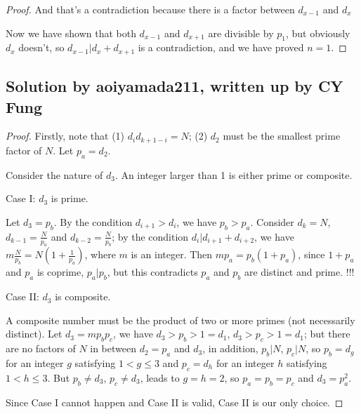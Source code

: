 \begin{proof}
And that's a contradiction because there is a factor between $ d_{x-1} $ and $ d_x $

Now we have shown that both $ d_{x - 1} $ and $ d_{x + 1} $ are divisible by $ p_1 $, but obviously $ d_x $ doesn't, so $ d_{x-1} | d_x + d_{x+1} $ is a contradiction, and we have proved $ n = 1 $.

\end{proof}

\subsection*{Solution by aoiyamada211, written up by CY Fung}

\begin{proof}

Firstly, note that (1) $d_i d_{k+1-i} = N$; (2) $d_2$ must be the smallest prime factor of $N$. Let $p_a = d_2$.

\hspace{3em}

Consider the nature of $d_3$. An integer larger than 1 is either prime or composite.

\hspace{3em}

Case I: $d_3$ is prime.

Let $d_3 = p_b$. By the condition $d_{i+1} > d_i$, we have $p_b > p_a$. Consider $d_k = N$, $d_{k-1} = \frac{N}{p_a}$ and $d_{k-2} = \frac{N}{p_b}$; by the condition $d_i | d_{i+1} + d_{i+2}$, we have $ m \frac{N}{p_b} = N(1+\frac{1}{p_a}) $, where $m$ is an integer. Then $ m p_a = p_b (1 + p_a)$, since $1+p_a$ and $p_a$ is coprime, $p_a | p_b$, but this contradicts $p_a$ and $p_b$ are distinct and prime. !!!

\hspace{3em}

Case II: $d_3$ is composite.

A composite number must be the product of two or more primes (not necessarily distinct). Let $d_3 = m p_b p_c $, we have $d_3 > p_b > 1 = d_1 $, $d_3 > p_c > 1 = d_1$; but there are no factors of $N$ in between $d_2 = p_a$ and $d_3$, in addition, $p_b | N$, $p_c | N$, so $p_b = d_g$ for an integer $g$ satisfying $1 < g \le 3$ and $p_c = d_h$ for an integer $h$ satisfying $1 < h \le 3$. But $p_b \ne d_3$, $p_c \ne d_3$, leads to $g = h = 2$, so $p_a = p_b = p_c$ and $d_3 = p_a^2$.

\hspace{3em}

Since Case I cannot happen and Case II is valid, Case II is our only choice.


\end{proof}
